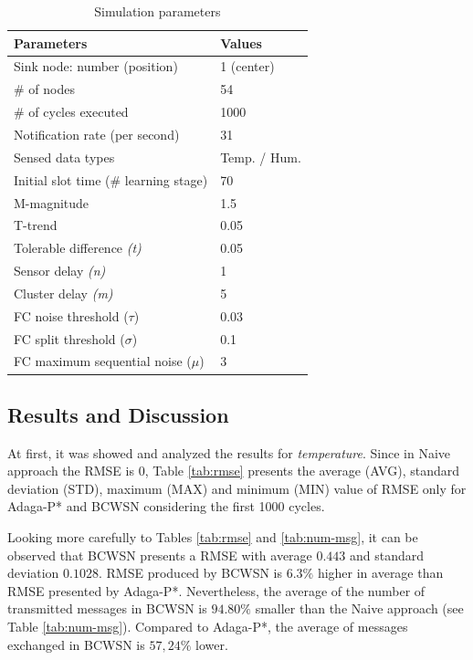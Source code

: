 \documentclass{acm_proc_article-sp}
\begin{document}
\begin{table}[h!]
\tiny 
\caption{Simulation parameters}
\label{tab:parameters}
\begin{center}
\begin{tabular}{|l||l|}
\hline
Parameters &Values\\
\hline\hline
Sink node: number (position) &1 (center) \\
\hline
\# of nodes &54 \\
\hline
\# of cycles executed &1000 \\
\hline
Notification rate (per second) &31 \\
\hline
Sensed data types &Temp. / Hum. \\
\hline
Initial slot time (\# learning stage) &70 \\
\hline
M-magnitude &1.5 \\
\hline
T-trend &0.05 \\
\hline
Tolerable difference {\it(t)} &0.05 \\
\hline
Sensor delay {\it(n)} &1 \\
\hline
Cluster delay {\it(m)} &5 \\
\hline
FC noise threshold ($\tau$) &0.03 \\
\hline
FC split threshold ($\sigma$) &0.1 \\
\hline
FC maximum sequential noise ($\mu$) &3 \\
\hline
\end{tabular}
\end{center}
\end{table}
\vspace*{-.3cm}


\subsection{Results and Discussion}
\label{results-and-discussion}

At first, it was showed and analyzed the results for {\it temperature}. Since in
Naive approach the RMSE is $0$, Table \ref{tab:rmse} presents the average (AVG),
standard deviation (STD), maximum (MAX) and minimum (MIN) value of RMSE only for
Adaga-P* and BCWSN considering the first 1000 cycles.
\vspace*{-.6cm}

Looking more carefully to Tables \ref{tab:rmse} and \ref{tab:num-msg}, it can be
observed that BCWSN presents a RMSE with average $0.443$ and standard deviation
$0.1028$. RMSE produced by BCWSN is $6.3\%$ higher in average than RMSE
presented by Adaga-P*. Nevertheless, the average of the number of transmitted
messages in BCWSN is $94.80\%$ smaller than the Naive approach (see Table
\ref{tab:num-msg}). Compared to Adaga-P*, the average of messages exchanged in
BCWSN is $57,24\%$ lower.
\end{document}
